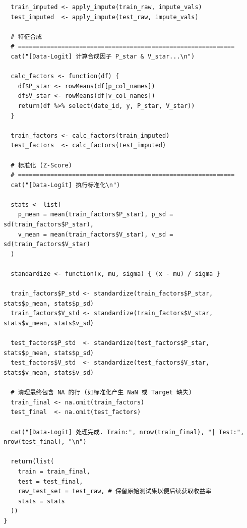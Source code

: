 \documentclass[11pt, a4paper]{article}
\begin{document}
\begin{verbatim}
  train_imputed <- apply_impute(train_raw, impute_vals)
  test_imputed  <- apply_impute(test_raw, impute_vals)
  
  # 特征合成
  # ============================================================
  cat("[Data-Logit] 计算合成因子 P_star & V_star...\n")
  
  calc_factors <- function(df) {
    df$P_star <- rowMeans(df[p_col_names])
    df$V_star <- rowMeans(df[v_col_names])
    return(df %>% select(date_id, y, P_star, V_star))
  }
  
  train_factors <- calc_factors(train_imputed)
  test_factors  <- calc_factors(test_imputed)
  
  # 标准化 (Z-Score)
  # ============================================================
  cat("[Data-Logit] 执行标准化\n")
  
  stats <- list(
    p_mean = mean(train_factors$P_star), p_sd = sd(train_factors$P_star),
    v_mean = mean(train_factors$V_star), v_sd = sd(train_factors$V_star)
  )
  
  standardize <- function(x, mu, sigma) { (x - mu) / sigma }
  
  train_factors$P_std <- standardize(train_factors$P_star, stats$p_mean, stats$p_sd)
  train_factors$V_std <- standardize(train_factors$V_star, stats$v_mean, stats$v_sd)
  
  test_factors$P_std  <- standardize(test_factors$P_star, stats$p_mean, stats$p_sd)
  test_factors$V_std  <- standardize(test_factors$V_star, stats$v_mean, stats$v_sd)
  
  # 清理最终包含 NA 的行 (如标准化产生 NaN 或 Target 缺失)
  train_final <- na.omit(train_factors)
  test_final  <- na.omit(test_factors)
  
  cat("[Data-Logit] 处理完成. Train:", nrow(train_final), "| Test:", nrow(test_final), "\n")
  
  return(list(
    train = train_final,
    test = test_final,
    raw_test_set = test_raw, # 保留原始测试集以便后续获取收益率
    stats = stats
  ))
}    
\end{verbatim}
\end{document}
